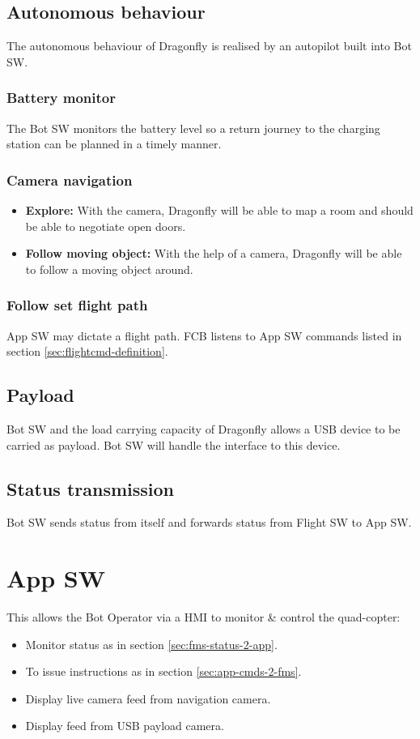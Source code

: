 \documentclass[a4paper]{article}
\begin{document}
  \subsection{Autonomous behaviour}
  The autonomous behaviour of Dragonfly is realised by an autopilot built into Bot SW.

  \subsubsection{Battery monitor}
  The Bot SW monitors the battery level so a return journey to the charging station can be planned in a timely manner.

  \subsubsection{Camera navigation}
  \begin{itemize}
    \item \textbf{Explore:} With the camera, Dragonfly will be able to map a room and should be able to negotiate open doors.
    \item \textbf{Follow moving object:} With the help of a camera, Dragonfly will be able to follow a moving object around.
  \end{itemize}

  \subsubsection{Follow set flight path}
  App SW may dictate a flight path. FCB listens to App SW commands listed in section \ref{sec:flightcmd-definition}.
  \subsection{Payload}
  Bot SW and the load carrying capacity of Dragonfly allows a USB device to be carried as payload. Bot SW will handle the interface to this device.
  \subsection{Status transmission}
  Bot SW sends status from itself and forwards status from Flight SW to App SW.

\section{App SW}
This allows the Bot Operator via a HMI to monitor \& control the quad-copter:
\begin{itemize}
\item Monitor status as in section \ref{sec:fms-status-2-app}.
\item To issue instructions as in section \ref{sec:app-cmds-2-fms}.
\item Display live camera feed from navigation camera.
\item Display feed from USB payload camera.
\end{itemize}
\end{document}
